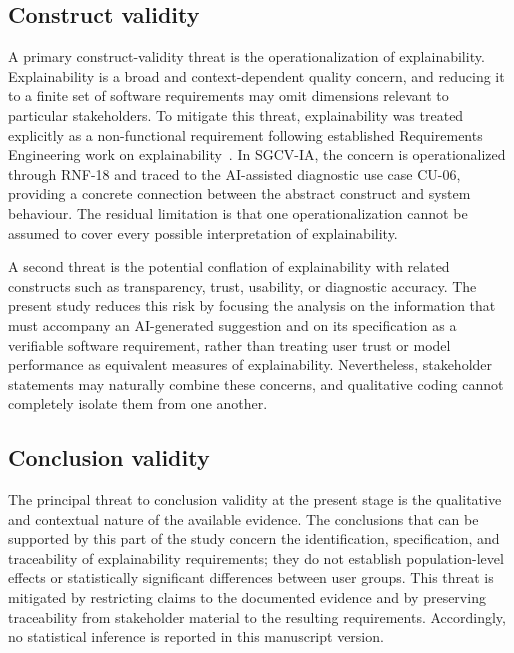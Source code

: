 \documentclass[pdflatex,sn-mathphys-num,Numbered]{sn-jnl}
\begin{document}
\subsection{Construct validity}\label{tv:construct}

A primary construct-validity threat is the operationalization of explainability. Explainability is a broad and context-dependent quality concern, and reducing it to a finite set of software requirements may omit dimensions relevant to particular stakeholders. To mitigate this threat, explainability was treated explicitly as a non-functional requirement following established Requirements Engineering work on explainability~\cite{chazette2020,chazette2021,chazette2022}. In SGCV-IA, the concern is operationalized through RNF-18 and traced to the AI-assisted diagnostic use case CU-06, providing a concrete connection between the abstract construct and system behaviour. The residual limitation is that one operationalization cannot be assumed to cover every possible interpretation of explainability.

A second threat is the potential conflation of explainability with related constructs such as transparency, trust, usability, or diagnostic accuracy. The present study reduces this risk by focusing the analysis on the information that must accompany an AI-generated suggestion and on its specification as a verifiable software requirement, rather than treating user trust or model performance as equivalent measures of explainability. Nevertheless, stakeholder statements may naturally combine these concerns, and qualitative coding cannot completely isolate them from one another.

\subsection{Conclusion validity}\label{tv:conclusion}

The principal threat to conclusion validity at the present stage is the qualitative and contextual nature of the available evidence. The conclusions that can be supported by this part of the study concern the identification, specification, and traceability of explainability requirements; they do not establish population-level effects or statistically significant differences between user groups. This threat is mitigated by restricting claims to the documented evidence and by preserving traceability from stakeholder material to the resulting requirements. Accordingly, no statistical inference is reported in this manuscript version.
\end{document}
